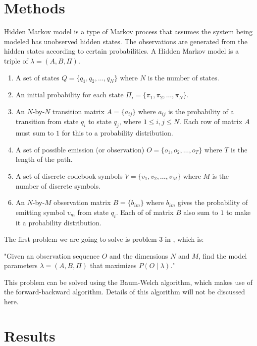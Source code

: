 \documentclass[twoside]{article}
\begin{document}
\begin{multicols}{2}
\section{Methods}
Hidden Markov model is a type of Markov process that assumes the system being modeled has unobserved hidden states. The observations are generated from the hidden states according to certain probabilities\cite{Elmez07}. A Hidden Markov model is a triple of $\lambda=(A, B, \Pi)$. 
\begin{enumerate}
	\item A set of states $Q = \{q_1, q_2, \ldots, q_N\}$ where $N$ is the number of states.
	\item An initial probability for each state $\Pi_i =\{\pi_1, \pi_2, \ldots, \pi_N\}$.
	\item An $N$-by-$N$ transition matrix $A=\{a_{ij}\}$ where $a_{ij}$ is the probability of a transition from state $q_i$ to state $q_j$, where $1 \leq i,j \leq N$. Each row of matrix $A$ must sum to $1$ for this to a probability distribution.
	\item A set of possible emission (or observation) $O=\{o_1, o_2, \ldots, o_T\}$ where $T$ is the length of the path.
	\item A set of discrete codebook symbols $V = \{v_1, v_2, \ldots, v_M\}$ where $M$ is the number of discrete symbols.
	\item An $N$-by-$M$ observation matrix $B=\{b_{im}\}$ where $b_{im}$ gives the probability of emitting symbol $v_m$ from state $q_i$. Each of of matrix $B$ also sum to $1$ to make it a probability distribution.
\end{enumerate}

The first problem we are going to solve is problem 3 in \cite{Rabiner89}, which is:

"Given an observation sequence $O$ and the dimensions $N$ and $M$, find the model parameters $\lambda=(A,B,\Pi)$ that maximizes $P(O\mid \lambda)$."

This problem can be solved using the Baum-Welch algorithm, which makes use of the forward-backward algorithm. Details of this algorithm will not be discussed here.


\section{Results}



\end{multicols}
\end{document}
